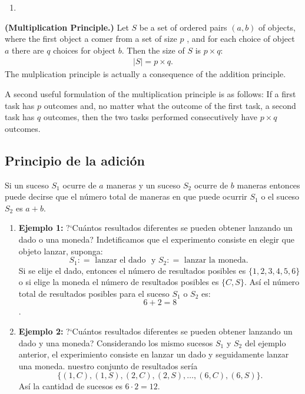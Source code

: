 \begin{example}
    \hspace{0mm}
    \begin{enumerate}
        \item 
    \end{enumerate}
\end{example}
\begin{definition}{\bf (Multiplication Principle.)}
    Let $S$ be a set of ordered pairs $(a,b)$ of objects, where the first object a comer from a set of size $p$
    , and for each choice of object $a$ there are $q$ choices for object $b$. Then the size of $S$ is $p\times q$:
    \begin{align}
        |S| = p\times q.
    \end{align}
    The mulplication principle is actually a consequence of the addition principle.

    A second useful formulation of the multiplication principle is as follows: If a first
    task has $p$ outcomes and, no matter what the outcome of the first task, a second task
    has $q$ outcomes, then the two tasks performed consecutively have $p \times q$ outcomes.
\end{definition}
\subsection{Principio de la adici\'on}
Si un suceso $S_{1}$  ocurre de $a$ maneras y un suceso $S_{2}$ ocurre de $b$ maneras entonces puede decirse que el n\'umero total de maneras en que puede
ocurrir $S_1$ o el suceso $S_2$ es $a+b$.


\begin{example}
    \hspace{0mm}
    \begin{enumerate}[{\rm 1}]
        \item {\bf Ejemplo 1:}  ?`Cu\'antos resultados diferentes se pueden obtener lanzando un dado o una moneda?
        Indetificamos que el experimento consiste en elegir que objeto lanzar, suponga:
        $$ S_1\colon = \text{ lanzar el dado } \text{ y } S_2 \colon = \text{ lanzar la moneda. }$$
        Si se elije el dado, entonces el n\'umero de resultados posibles es $\{1,2,3,4,5,6\}$ o 
        si elige la moneda el n\'umero de resultados posibles es $\{C,S\}$. 
        As\'i el n\'umero total de resultados posibles para el suceso $S_1$ o $S_2$ es: $$6+2=8$$.
        \item {\bf Ejemplo 2:}  ?`Cu\'antos resultados diferentes se pueden obtener lanzando un dado y una moneda?
        Considerando los mismo sucesos $S_1$ y $S_2$ del ejemplo anterior, el experimiento consiste en lanzar un dado y seguidamente lanzar una moneda.
        nuestro conjunto de resultados ser\'ia
        $$ \{ {(1,C), (1,S)}, (2,C), (2,S), \ldots, (6,C), (6,S) \}. $$
        As\'i la cantidad de sucesos es $6\cdot2 = 12.$
        
    \end{enumerate}
\end{example}

